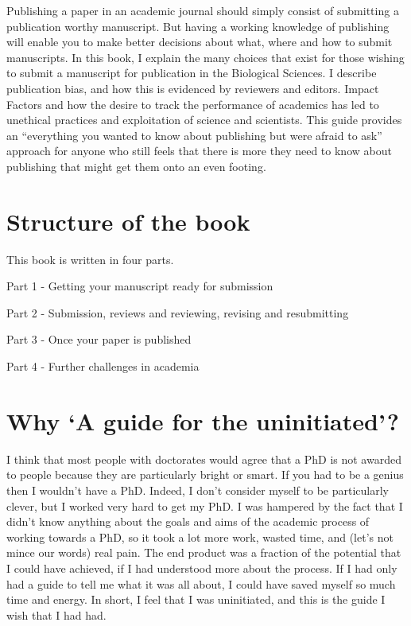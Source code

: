 \documentclass[
]{krantz}
\begin{document}
Publishing a paper in an academic journal should simply consist of submitting a publication worthy manuscript. But having a working knowledge of publishing will enable you to make better decisions about what, where and how to submit manuscripts. In this book, I explain the many choices that exist for those wishing to submit a manuscript for publication in the Biological Sciences. I describe publication bias, and how this is evidenced by reviewers and editors. Impact Factors and how the desire to track the performance of academics has led to unethical practices and exploitation of science and scientists. This guide provides an ``everything you wanted to know about publishing but were afraid to ask'' approach for anyone who still feels that there is more they need to know about publishing that might get them onto an even footing.

\hypertarget{structure-of-the-book}{%
\section*{Structure of the book}\label{structure-of-the-book}}


This book is written in four parts.

Part 1 - Getting your manuscript ready for submission

Part 2 - Submission, reviews and reviewing, revising and resubmitting

Part 3 - Once your paper is published

Part 4 - Further challenges in academia

\hypertarget{why-a-guide-for-the-uninitiated}{%
\section*{Why `A guide for the uninitiated'?}\label{why-a-guide-for-the-uninitiated}}


I think that most people with doctorates would agree that a PhD is not awarded to people because they are particularly bright or smart. If you had to be a genius then I wouldn't have a PhD. Indeed, I don't consider myself to be particularly clever, but I worked very hard to get my PhD. I was hampered by the fact that I didn't know anything about the goals and aims of the academic process of working towards a PhD, so it took a lot more work, wasted time, and (let's not mince our words) real pain. The end product was a fraction of the potential that I could have achieved, if I had understood more about the process. If I had only had a guide to tell me what it was all about, I could have saved myself so much time and energy. In short, I feel that I was uninitiated, and this is the guide I wish that I had had.
\end{document}
